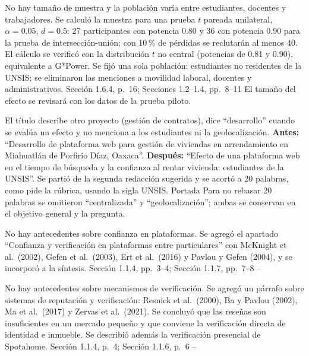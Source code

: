 \documentclass[10pt]{article}
\begin{document}
\begin{matriz}
  {No hay tamaño de muestra y la población varía entre estudiantes, docentes y trabajadores.}
  {Se calculó la muestra para una prueba $t$ pareada unilateral, $\alpha = 0.05$, $d = 0.5$: 27 participantes con potencia 0.80 y 36 con potencia 0.90 para la prueba de intersección-unión; con 10\,\% de pérdidas se reclutarán al menos 40. El cálculo se verificó con la distribución $t$ no central (potencias de 0.81 y 0.90), equivalente a G*Power.\newline
   Se fijó una sola población: estudiantes no residentes de la UNSIS; se eliminaron las menciones a movilidad laboral, docentes y administrativos.}
  {Sección 1.6.4, p.~16; Secciones 1.2--1.4, pp.~8--11}
  {\Atendida}
  {El tamaño del efecto se revisará con los datos de la prueba piloto.}
  {}

  {El título describe otro proyecto (gestión de contratos), dice ``desarrollo'' cuando se evalúa un efecto y no menciona a los estudiantes ni la geolocalización.}
  {\textbf{Antes:} ``Desarrollo de plataforma web para gestión de viviendas en arrendamiento en Miahuatlán de Porfirio Díaz, Oaxaca''.\newline
   \textbf{Después:} ``Efecto de una plataforma web en el tiempo de búsqueda y la confianza al rentar vivienda: estudiantes de la UNSIS''.\newline
   Se partió de la segunda redacción sugerida y se acortó a 20 palabras, como pide la rúbrica, usando la sigla UNSIS.}
  {Portada}
  {\Atendida}
  {Para no rebasar 20 palabras se omitieron ``centralizada'' y ``geolocalización''; ambas se conservan en el objetivo general y la pregunta.}
  {}

  {No hay antecedentes sobre confianza en plataformas.}
  {Se agregó el apartado ``Confianza y verificación en plataformas entre particulares'' con McKnight et al.\ (2002), Gefen et al.\ (2003), Ert et al.\ (2016) y Pavlou y Gefen (2004), y se incorporó a la síntesis.}
  {Sección 1.1.4, pp.~3--4; Sección 1.1.7, pp.~7--8}
  {\Atendida}{--}{}

  {No hay antecedentes sobre mecanismos de verificación.}
  {Se agregó un párrafo sobre sistemas de reputación y verificación: Resnick et al.\ (2000), Ba y Pavlou (2002), Ma et al.\ (2017) y Zervas et al.\ (2021). Se concluyó que las reseñas son insuficientes en un mercado pequeño y que conviene la verificación directa de identidad e inmueble. Se describió además la verificación presencial de Spotahome.}
  {Sección 1.1.4, p.~4; Sección 1.1.6, p.~6}
  {\Atendida}{--}{}


\end{matriz}
\end{document}
